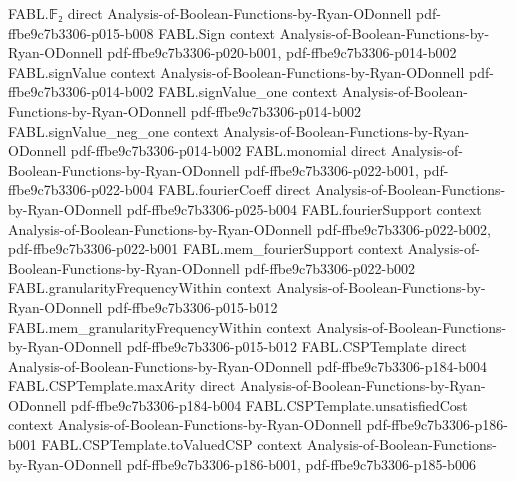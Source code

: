 \begin{theorem}
\label{FABL.expect_satisfiedIndicator_maxE3Sat}
\leanok
{}
\proofstep
  {FABL.𝔽₂}
  {direct}
  {Analysis-of-Boolean-Functions-by-Ryan-ODonnell}
  {pdf-ffbe9c7b3306-p015-b008}
\proofstep
  {FABL.Sign}
  {context}
  {Analysis-of-Boolean-Functions-by-Ryan-ODonnell}
  {pdf-ffbe9c7b3306-p020-b001,
    pdf-ffbe9c7b3306-p014-b002}
\proofstep
  {FABL.signValue}
  {context}
  {Analysis-of-Boolean-Functions-by-Ryan-ODonnell}
  {pdf-ffbe9c7b3306-p014-b002}
\proofstep
  {FABL.signValue_one}
  {context}
  {Analysis-of-Boolean-Functions-by-Ryan-ODonnell}
  {pdf-ffbe9c7b3306-p014-b002}
\proofstep
  {FABL.signValue_neg_one}
  {context}
  {Analysis-of-Boolean-Functions-by-Ryan-ODonnell}
  {pdf-ffbe9c7b3306-p014-b002}
\proofstep
  {FABL.monomial}
  {direct}
  {Analysis-of-Boolean-Functions-by-Ryan-ODonnell}
  {pdf-ffbe9c7b3306-p022-b001,
    pdf-ffbe9c7b3306-p022-b004}
\proofstep
  {FABL.fourierCoeff}
  {direct}
  {Analysis-of-Boolean-Functions-by-Ryan-ODonnell}
  {pdf-ffbe9c7b3306-p025-b004}
\proofstep
  {FABL.fourierSupport}
  {context}
  {Analysis-of-Boolean-Functions-by-Ryan-ODonnell}
  {pdf-ffbe9c7b3306-p022-b002,
    pdf-ffbe9c7b3306-p022-b001}
\proofstep
  {FABL.mem_fourierSupport}
  {context}
  {Analysis-of-Boolean-Functions-by-Ryan-ODonnell}
  {pdf-ffbe9c7b3306-p022-b002}
\proofstep
  {FABL.granularityFrequencyWithin}
  {context}
  {Analysis-of-Boolean-Functions-by-Ryan-ODonnell}
  {pdf-ffbe9c7b3306-p015-b012}
\proofstep
  {FABL.mem_granularityFrequencyWithin}
  {context}
  {Analysis-of-Boolean-Functions-by-Ryan-ODonnell}
  {pdf-ffbe9c7b3306-p015-b012}
\proofstep
  {FABL.CSPTemplate}
  {direct}
  {Analysis-of-Boolean-Functions-by-Ryan-ODonnell}
  {pdf-ffbe9c7b3306-p184-b004}
\proofstep
  {FABL.CSPTemplate.maxArity}
  {direct}
  {Analysis-of-Boolean-Functions-by-Ryan-ODonnell}
  {pdf-ffbe9c7b3306-p184-b004}
\proofstep
  {FABL.CSPTemplate.unsatisfiedCost}
  {context}
  {Analysis-of-Boolean-Functions-by-Ryan-ODonnell}
  {pdf-ffbe9c7b3306-p186-b001}
\proofstep
  {FABL.CSPTemplate.toValuedCSP}
  {context}
  {Analysis-of-Boolean-Functions-by-Ryan-ODonnell}
  {pdf-ffbe9c7b3306-p186-b001,
    pdf-ffbe9c7b3306-p185-b006}

\end{theorem}
